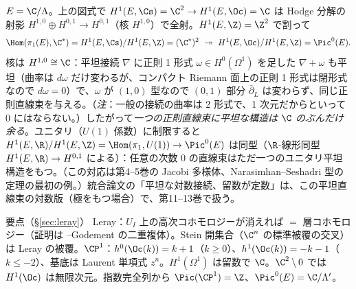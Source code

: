\begin{ex}\label{ex:flatE}\tP
$E=\C/\Lambda$。上の図式で $H^1(E,\Cs)=\C^2\to H^1(E,\Oc)=\C$ は Hodge 分解の射影 $H^{1,0}\oplus H^{0,1}\to H^{0,1}$（核 $H^{1,0}$）で全射。$H^1(E,\Z)=\Z^2$ で割って
\[
\Hom(\pi_1(E),\C^*)=H^1(E,\Cs)/H^1(E,\Z)=(\C^*)^2\ \twoheadrightarrow\ H^1(E,\Oc)/H^1(E,\Z)=\Pic^0(E).
\]
核は $H^{1,0}\cong\C$：平坦接続 $\nabla$ に正則 1 形式 $\omega\in H^0(\Omega^1)$ を足した $\nabla+\omega$ も平坦（曲率は $d\omega$ だけ変わるが、コンパクト Riemann 面上の正則 1 形式は閉形式なので $d\omega=0$）で、$\omega$ が $(1,0)$ 型なので $(0,1)$ 部分 $\bar\partial_L$ は変わらず、同じ正則直線束を与える。（\emph{注}：一般の接続の曲率は 2 形式で、1 次元だからといって $0$ にはならない。）したがって\emph{一つの正則直線束に平坦な構造は $\C$ のぶんだけ余る}。ユニタリ（$U(1)$ 係数）に制限すると $H^1(E,\R)/H^1(E,\Z)=\Hom(\pi_1,U(1))\to\Pic^0(E)$ は同型（$\R$-線形同型 $H^1(E,\R)\to H^{0,1}$ による）：任意の次数 0 の直線束はただ一つのユニタリ平坦構造をもつ。（この対応は第4--5巻の Jacobi 多様体、Narasimhan--Seshadri 型の定理の最初の例。）統合論文の「平坦な対数接続、留数が定数」は、この平坦直線束の対数版（極をもつ場合）で、第11--13巻で扱う。
\end{ex}

\begin{keybox}{要点（§\ref{sec:leray}）}
Leray：$U_I$ 上の高次コホモロジーが消えれば \Cech{} $=$ 層コホモロジー（証明は \Cech{}--Godement の二重複体）。Stein 開集合（$\C^n$ の標準被覆の交叉）は Leray の被覆。$\CP^1$：$h^0(\Oc(k))=k+1$（$k\ge0$）、$h^1(\Oc(k))=-k-1$（$k\le-2$）、基底は Laurent 単項式 $z^n$。$H^1(\Omega^1)$ は留数で $\C$。$\C^2\setminus0$ では $H^1(\Oc)$ は無限次元。指数完全列から $\Pic(\CP^1)=\Z$、$\Pic^0(E)=\C/\Lambda'$。
\end{keybox}

